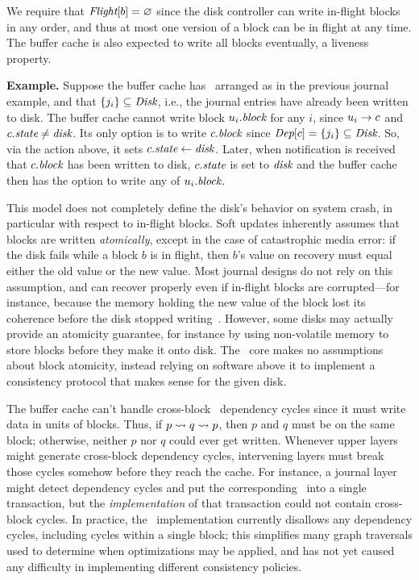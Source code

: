 \noindent
%
We require that $\PInf[b] = \emptyset$ since the disk controller can write
in-flight blocks in any order, and thus at most one version of a block can
be in flight at any time.
%
The buffer cache is also expected to write all blocks eventually, a
 liveness property.

\textbf{Example.}
%
Suppose the buffer cache has \patches\ arranged as in the previous journal
example, and that $\{j_i\} \subseteq \PDisk$, i.e., the journal entries have
already been written to disk.
%
The buffer cache cannot write block $u_i.\textit{block}$ for any $i$, since $u_i
\rightarrow c$ and $c.\textit{state} \neq \textit{disk}$.
%
Its only option is to write $c.\textit{block}$ since $\PDepset{c} = \{j_i\}
\subseteq \PDisk$.
%
So, via the action above, it sets $c.\textit{state} \gets \textit{disk}$.
%
Later, when notification is received that $c.\textit{block}$ has been written to disk,
$c.\textit{state}$ is set to $\textit{disk}$ and the buffer cache then has the option to
write any of $u_i.\textit{block}$.

This model does not completely define the disk's behavior on system crash,
 in particular with respect to in-flight blocks.
%
Soft updates inherently assumes that blocks are written
\emph{atomically}, except in the case of catastrophic media error:
%
if the disk fails while a block $b$ is in flight, then $b$'s
value on recovery must equal either the old value or the new value.
%
Most journal designs do not rely on this assumption, and can recover
 properly even if in-flight blocks are corrupted---for instance,
 because the memory holding the new value of the block lost its coherence
 before the disk stopped writing~\cite{nightingale06rethink}.
%
However, some disks may actually provide an atomicity guarantee, for
 instance by using non-volatile memory to store blocks before they make it
 onto disk.
%
The \Kudos\ core makes no assumptions about block atomicity, instead relying
 on software above it to implement a consistency protocol that makes sense
 for the given disk.


The buffer cache can't handle cross-block \patch\ dependency cycles since
it must write data in units of blocks.
%
Thus, if $p \leadsto q \leadsto p$, then $p$ and $q$ must be on the same
block; otherwise, neither $p$ nor $q$ could ever get written.
%
Whenever upper layers might generate cross-block dependency cycles,
intervening layers must break those cycles somehow before they reach the
cache.
%
For instance, a journal layer might detect dependency cycles and put the
corresponding \patches\ into a single transaction, but the
\emph{implementation} of that transaction could not contain cross-block
cycles.
%
In practice, the \Kudos\ implementation currently disallows any dependency
cycles, including cycles within a single block; this simplifies many graph
traversals used to determine when optimizations may be applied, and has not
yet caused any difficulty in implementing different consistency policies.



